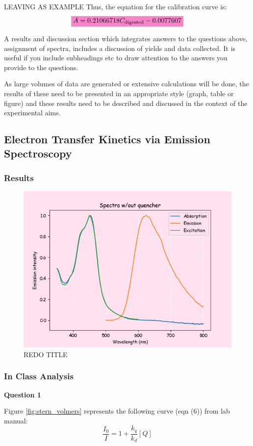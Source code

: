 \documentclass[main.tex]{subfiles}
\begin{document}
LEAVING AS EXAMPLE
Thus, the equation for the calibration curve is:
\begin{equation*}
    \mathcolorbox{Lavender}{A = 0.21066718C_{\text{digested}} -0.0077607}
\end{equation*}

A results and discussion section which integrates answers to the questions above, assignment of spectra, 
includes a discussion of yields and data collected. It is useful if you include subheadings etc to draw attention to 
the answers you provide to the questions.

As large volumes of data are generated or extensive calculations will be done, the results of these need 
to be presented in an appropriate style (graph, table or figure) and these results need to be described 
and discussed in the context of the experimental aims.

\subsection{Electron Transfer Kinetics via Emission Spectroscopy}
\subsubsection*{Results}
\begin{figure}[H]
    \centering
    \includegraphics[width = 0.7\linewidth]{part1_noq.png}
    \caption{REDO TITLE}
    \label{fig:enter-label}
\end{figure}
\subsubsection*{In Class Analysis}
\textbf{Question 1} 


Figure \ref{fig:stern_volmers} represents the following curve (eqn (6)) from lab manual\autocite{lab_manual}:
\begin{equation*}
    \frac{I_0}{I} = 1 + \frac{k_q}{k_d}[Q]
\end{equation*}
\end{document}
